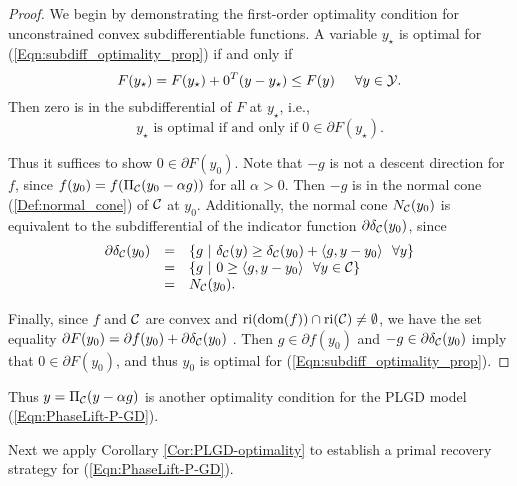 \begin{proof}
We begin by demonstrating the first-order optimality condition for unconstrained convex subdifferentiable functions.  A variable $y_\star$ is optimal for (\ref{Eqn:subdiff_optimality_prop}) if and only if
\begin{equation}
F(y_\star) = F(y_\star) + 0^T(y - y_\star)  \leq F(y)	\hspace{.5cm} \forall y \in {\mathcal Y}.
\end{equation}
Then zero is in the subdifferential of $F$ at $y_\star$, i.e.,
\begin{equation}
y_\star \text{ is optimal if and only if } 0 \in \partial F(y_\star).
\end{equation}

Thus it suffices to show $0 \in \partial F(y_0)$.  Note that $-g$ is not a descent direction for $f$, since $f(y_0) = f(\Pi_{\mathcal C}(y_0 - \alpha g))$ for all $\alpha >0$.  Then $-g$ is in the normal cone (\ref{Def:normal_cone}) of ${\mathcal C}$ at $y_0$.  Additionally, the normal cone $N_{\mathcal C}(y_0)$ is equivalent to the subdifferential of the indicator function $\partial \delta_{\mathcal C}(y_0)$, since
\begin{equation}
\begin{array}{rcl}
\partial \delta_\caC(y_0)
	&	=	&	\{ g \ | \ \delta_\caC(y) \geq \delta_\caC(y_0) + \langle g, y - y_0 \rangle \ \ \forall y \}	\\
	&	=	& \{ g \ | \ 0 \geq  \langle g, y - y_0 \rangle \ \ \forall y \in \caC \}	\\
	&	=	&	N_\caC(y_0).
\end{array}
\end{equation}

Finally, since $f$ and ${\mathcal C}$ are convex and $\textnormal{ri}( \textnormal{dom} (f)) \cap \textnormal{ri}({\mathcal C}) \neq \emptyset$, we have the set equality $\partial F(y_0) = \partial f(y_0) + \partial \delta_{\mathcal C}(y_0)$ \cite[Theorem 23.8]{rockafellar1970convex}.  Then $g \in \partial f(y_0)$ and $-g \in \partial \delta_{\mathcal C}(y_0)$ imply that $0 \in \partial F(y_0)$, and thus $y_0$ is optimal for (\ref{Eqn:subdiff_optimality_prop}).

\end{proof}

Thus $y = \Pi_{\mathcal C}(y - \alpha g)$ is another optimality condition for the PLGD model (\ref{Eqn:PhaseLift-P-GD}). 




Next we apply Corollary \ref{Cor:PLGD-optimality} to establish a primal recovery strategy for (\ref{Eqn:PhaseLift-P-GD}).

